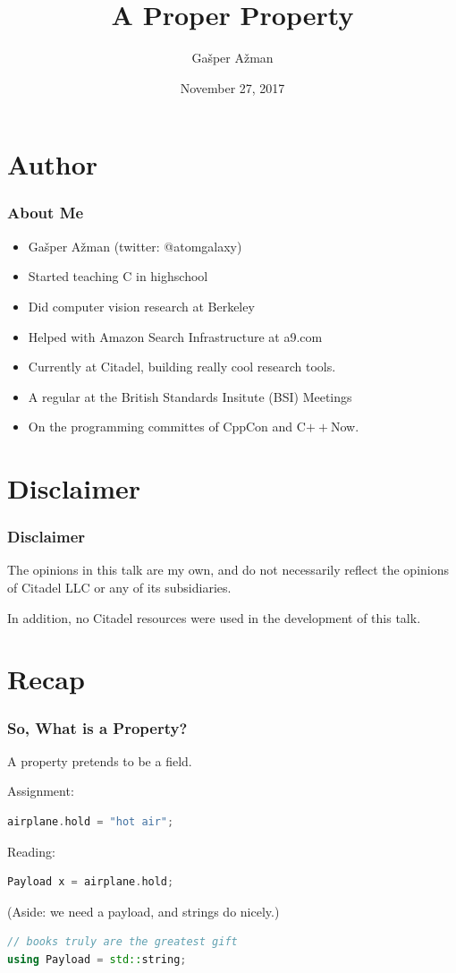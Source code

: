 \documentclass{beamer}
\title{A Proper Property}
\author{Gašper Ažman}
\date{November 27, 2017}
\newcommand{\CC}{C\nolinebreak\hspace{-.05em}\raisebox{0.4ex}{\resizebox{!}{0.6\baselineskip}{\bf++}}}
\newcommand{\cplusplus}{\protect\CC\xspace}
\newcommand{\nl}{\vspace{0.2\baselineskip}}
\begin{document}
\begin{frame}
  \titlepage
\end{frame}


\section{Author}
\begin{frame}
  \frametitle{About Me}
  \begin{itemize}
    \item Gašper Ažman (twitter: @atomgalaxy)
    \item Started teaching \cplusplus in highschool
    \item Did computer vision research at Berkeley
    \item Helped with Amazon Search Infrastructure at a9.com
    \item Currently at Citadel, building really cool research tools.
    \item A regular at the British Standards Insitute (BSI) Meetings
    \item On the programming committes of CppCon and C$++$Now.
  \end{itemize}
\end{frame}

\section{Disclaimer}

\begin{frame}
\frametitle{Disclaimer}
The opinions in this talk are my own, and do not necessarily reflect the
opinions of Citadel LLC or any of its subsidiaries.\nl

In addition, no Citadel resources were used in the development of this talk.
\end{frame}


\section{Recap}
\begin{frame}[fragile]

\frametitle{So, What is a Property?}
\begin{center}
{\Large A property pretends to be a field.}
\end{center}

Assignment:
\begin{lstlisting}[language=cpp]
airplane.hold = "hot air";
\end{lstlisting}

Reading:
\begin{lstlisting}[language=cpp]
Payload x = airplane.hold;
\end{lstlisting}

(Aside: we need a payload, and strings do nicely.)
\begin{lstlisting}[language=cpp]
// books truly are the greatest gift
using Payload = std::string;
\end{lstlisting}

\end{frame}
\end{document}

